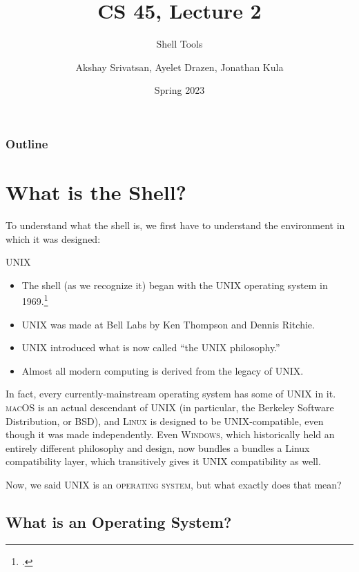 \usepackage[bib]{shared/cs45}

\title{CS 45, Lecture 2}
\subtitle{Shell Tools}
\date{Spring 2023}
\author{Akshay Srivatsan, Ayelet Drazen, Jonathan Kula}



\maketitle

\frame{\titlepage}

\begin{frame}
  \frametitle{Outline}
  \tableofcontents[hidesubsections]
\end{frame}

\section{What is the Shell?}

To understand what the shell is, we first have to understand the environment in
which it was designed:

\begin{frame}{UNIX}
  \begin{itemize}
    \item
      The shell (as we recognize it) began with the UNIX \alert<2>{operating
      system} in 1969.\footcite{ritchie:unix}
    \item
      UNIX was made at Bell Labs by Ken Thompson and Dennis Ritchie.
    \item
      UNIX introduced what is now called \enquote{the UNIX philosophy.}
    \item
      Almost all modern computing is derived from the legacy of UNIX.
  \end{itemize}
\end{frame}

In fact, every currently-mainstream operating system has some of UNIX in it.
\textsc{macOS} is an actual descendant of UNIX (in particular, the Berkeley
Software Distribution, or BSD), and \textsc{Linux} is designed to be
UNIX-compatible, even though it was made independently. Even \textsc{Windows},
which historically held an entirely different philosophy and design, now
bundles a bundles a Linux compatibility layer, which transitively gives it UNIX
compatibility as well.

Now, we said UNIX is an \textsc{operating system}, but what exactly does that mean?

\subsection{What is an Operating System?}

